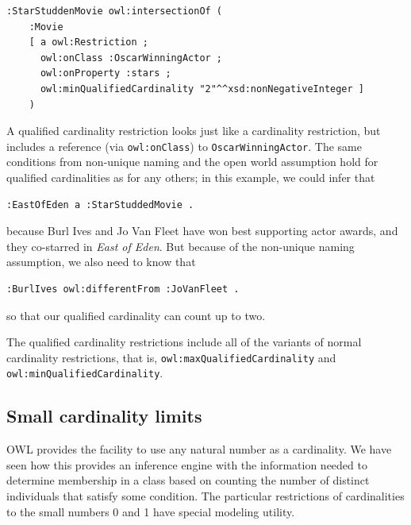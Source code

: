 \begin{lstlisting}
:StarStuddenMovie owl:intersectionOf (
    :Movie 
    [ a owl:Restriction ;
      owl:onClass :OscarWinningActor ;
      owl:onProperty :stars ;
      owl:minQualifiedCardinality "2"^^xsd:nonNegativeInteger ] 
    )
\end{lstlisting}

A
qualified cardinality restriction looks just like a cardinality
restriction, but includes a reference (via \texttt{owl:onClass}) to
\texttt{OscarWinningActor}. The same conditions from non-unique naming and the open world
assumption hold for qualified cardinalities as for any others; in this
example, we could infer that

\begin{lstlisting}
:EastOfEden a :StarStuddedMovie .
\end{lstlisting}

because Burl Ives and Jo Van Fleet have won best supporting actor awards, and they 
co-starred in \emph{East of Eden}.  But because of the non-unique naming assumption,
we also need to know that

\begin{lstlisting}
:BurlIves owl:differentFrom :JoVanFleet . 
\end{lstlisting}

so that our qualified cardinality can count up to two. 

The qualified cardinality
restrictions include all of the variants of normal cardinality
restrictions, that is, \texttt{owl:maxQualifiedCardinality} and
\texttt{owl:minQualifiedCardinality}.

\subsection{Small cardinality limits}

OWL provides the facility to use any natural number as a cardinality. We
have seen how this provides an inference engine with the information
needed to determine membership in a class based on counting the number
of distinct individuals that satisfy some condition. The particular
restrictions of cardinalities to the small numbers 0 and 1 have
special modeling utility.

